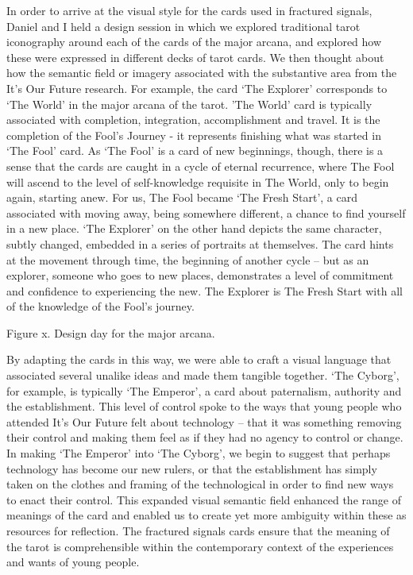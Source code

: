 
 
In order to arrive at the visual style for the cards used in fractured signals, Daniel and I held a design session in which we explored traditional tarot iconography around each of the cards of the major arcana, and explored how these were expressed in different decks of tarot cards. We then thought about how the semantic field or imagery associated with the substantive area from the It’s Our Future research. For example, the card ‘The Explorer’ corresponds to ‘The World’ in the major arcana of the tarot. ’The World’ card is typically associated with completion, integration, accomplishment and travel. It is the completion of the Fool’s Journey -  it represents finishing what was started in ‘The Fool’ card. As ‘The Fool’ is a card of new beginnings, though, there is a sense that the cards are caught in a cycle of eternal recurrence, where The Fool will ascend to the level of self-knowledge requisite in The World, only to begin again, starting anew. For us, The Fool became ‘The Fresh Start’, a card associated with moving away, being somewhere different, a chance to find yourself in a new place. ‘The Explorer’ on the other hand depicts the same character, subtly changed, embedded in a series of portraits at themselves. The card hints at the movement through time, the beginning of another cycle – but as an explorer, someone who goes to new places, demonstrates a level of commitment and confidence to experiencing the new. The Explorer is The Fresh Start with all of the knowledge of the Fool’s journey. 

Figure x. Design day for the major arcana.

By adapting the cards in this way, we were able to craft a visual language that associated several unalike ideas and made them tangible together. ‘The Cyborg’, for example, is typically ‘The Emperor’, a card about paternalism, authority and the establishment. This level of control spoke to the ways that young people who attended It’s Our Future felt about technology – that it was something removing their control and making them feel as if they had no agency to control or change. In making ‘The Emperor’ into ‘The Cyborg’, we begin to suggest that perhaps technology has become our new rulers, or that the establishment has simply taken on the clothes and framing of the technological in order to find new ways to enact their control. This expanded visual semantic field enhanced the range of meanings of the card and enabled us to create yet more ambiguity within these as resources for reflection. The fractured signals cards ensure that the meaning of the tarot is comprehensible within the contemporary context of the experiences and wants of young people. 

